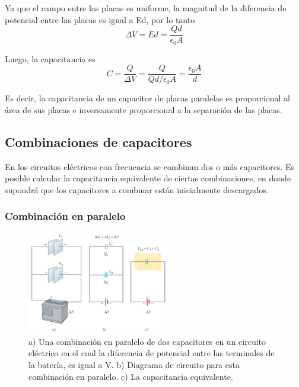       \PN Ya que el campo entre las placas es uniforme, la magnitud de la diferencia de potencial entre las placas es
      igual a Ed, por lo tanto
      \begin{equation*}
        \Delta V = Ed = \frac{Qd}{\epsilon_{0}A}
      \end{equation*}

      \PN Luego, la capacitancia es
      \begin{equation*}
        C = \frac{Q}{\Delta V} = \frac{Q}{Qd/\epsilon_{0}A} = \frac{\epsilon_{0}A}{d}
      \end{equation*}

      \PN Es decir, la capacitancia de un capacitor de placas paralelas es proporcional al área de sus placas e
      inversamente proporcional a la separación de las placas.

  \subsection{Combinaciones de capacitores}
    \PN En los circuitos eléctricos con frecuencia se combinan dos o más capacitores. Es posible calcular la
    capacitancia equivalente de ciertas combinaciones, en donde supondrá que los capacitores a combinar están
    inicialmente descargados.

    \subsubsection{Combinación en paralelo}
      \begin{figure}[H]
      \centering
        \includegraphics[width=0.55\textwidth]{4/figure_6}
        \caption{a) Una combinación en paralelo de dos capacitores en un circuito eléctrico en el cual la diferencia de
        potencial entre las terminales de la batería, es igual a V. b) Diagrama de circuito para esta combinación en
        paralelo. c) La capacitancia equivalente.}
      \end{figure}

